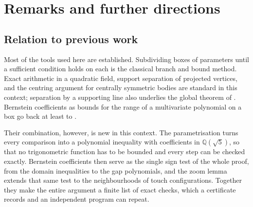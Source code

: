 \pagebreak[0]
\section{Remarks and further directions}\label{sec:remarks-and-further-directions}

\subsection{Relation to previous work}\label{subsec:relation-to-previous-work}

Most of the tools used here are established. Subdividing boxes of
parameters until a sufficient condition holds on each is the classical
branch and bound method. Exact arithmetic in a quadratic field, support
separation of projected vertices, and the centring argument for centrally
symmetric bodies are standard in this context; separation by a supporting
line also underlies the global theorem of
\citet[Section~4, Theorem~17]{SteiningerYurkevichNopertV2}. Bernstein
coefficients as bounds for the range of a multivariate polynomial on a box
go back at least to \citet{Garloff1986}.

Their combination, however, is new in this context. The parametrisation
turns every comparison into a polynomial inequality with coefficients in
$\mathbb Q(\sqrt5)$, so that no trigonometric function has to be bounded
and every step can be checked exactly. Bernstein coefficients then serve as
the single sign test of the whole proof, from the domain inequalities to
the gap polynomials, and the zoom lemma extends that same test to the
neighbourhoods of touch configurations. Together they make the entire
argument a finite list of exact checks, which a certificate records and an
independent program can repeat.

